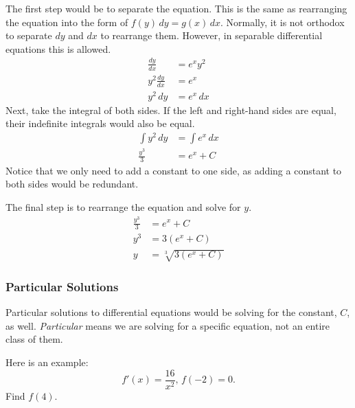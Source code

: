 \documentclass[12pt]{article}
\begin{document}
The first step would be to separate the equation. This is the same as rearranging the equation into the form of $f(y) \, dy = g(x) \, dx$. Normally, it is not orthodox to separate $dy$ and $dx$ to rearrange them. However, in separable differential equations this is allowed.
\begin{align*}
    \frac{dy}{dx}     & = e^x y^2   \\[6pt]
    y^2 \frac{dy}{dx} & = e^x       \\[6pt]
    y^2 \, dy         & = e^x \, dx
\end{align*}
Next, take the integral of both sides. If the left and right-hand sides are equal, their indefinite integrals would also be equal.
\begin{align*}
    \int y^2 \, dy & = \int e^x \, dx \\
    \frac{y^3}{3}  & = e^x + C
\end{align*}
Notice that we only need to add a constant to one side, as adding a constant to both sides would be redundant.

\noindent The final step is to rearrange the equation and solve for $y$.
\begin{align*}
    \frac{y^3}{3} & = e^x + C                            \\[6pt]
    y^3           & = 3 \left( e^x + C \right)           \\
    y             & = \sqrt[3]{3 \left( e^x + C \right)}
\end{align*}

\subsubsection{Particular Solutions}
Particular solutions to differential equations would be solving for the constant, $C$, as well. \textit{Particular} means we are solving for a specific equation, not an entire class of them.

\noindent Here is an example:
\[ f'(x) = \frac{16}{x^2}, \, f(-2) = 0. \]
Find $f(4)$.
\end{document}
